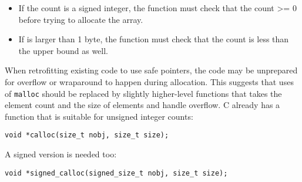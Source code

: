 \begin{itemize}
\item
  If the count is a signed integer, the function must check that the
  count \textgreater{}= 0 before trying to allocate the array.
\item
  If  is larger than 1 byte, the function must check that the
  count is less than the upper bound as well.
\end{itemize}

When retrofitting existing code to use safe pointers, the code may be
unprepared for overflow or wraparound to happen during allocation. This
suggests that uses of \texttt{malloc} should be replaced by slightly
higher-level functions that takes the element count and the size of
elements and handle overflow. C already has a function that is suitable
for unsigned integer counts:

\begin{verbatim}
void *calloc(size_t nobj, size_t size);
\end{verbatim}

A signed version is needed too:

\begin{verbatim}
void *signed_calloc(signed_size_t nobj, size_t size);
\end{verbatim}